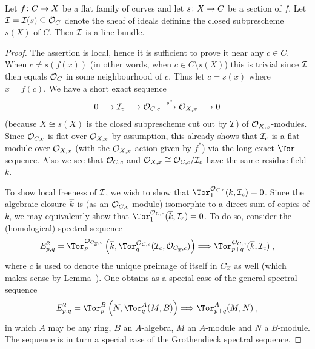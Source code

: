 \documentclass[a4paper,parskip=half,numbers=enddot, DIV=12]{scrreprt}
\begin{document}
\begin{lem}
	Let $f\colon C\morphism X$ be a flat family of curves and let $s\colon X\morphism C$ be a section of $f$. Let $\mathcal{I}=\mathcal{I}(s)\subseteq \mathcal{O}_C$ denote the sheaf of ideals defining the closed subprescheme $s(X)$ of $C$. Then $\mathcal{I}$ is a line bundle.
\end{lem}
\begin{proof}
	The assertion is local, hence it is sufficient to prove it near any $c\in C$. When $c\neq s(f(x))$ (in other words, when $c\in C\setminus s(X)$) this is trivial since $\mathcal{I}$ then equals $\mathcal{O}_C$ in some neighbourhood of $c$. Thus let $c=s(x)$ where $x=f(c)$. We have a short exact sequence
	\begin{align}\lbl{eq:s(X)closedSES}
		0\morphism \Ii_c\morphism \Oo_{C,c}\morphism[s^*]\Oo_{X,x}\morphism 0
	\end{align}
	(because $X\cong s(X)$ is the closed subprescheme cut out by $\mathcal{I}$) of $\mathcal{O}_{X,x}$-modules. Since $\mathcal{O}_{C,c}$ is flat over $\mathcal{O}_{X,x}$ by assumption, this already shows that $\mathcal{I}_c$ is a flat module over $\mathcal{O}_{X,x}$ (with the $\mathcal{O}_{X,x}$-action given by $f^*$) via the long exact $\Tor$ sequence. Also we see that $\mathcal{O}_{C,c}$ and $\mathcal{O}_{X,x}\cong \mathcal{O}_{C,c}/\mathcal{I}_c$ have the same residue field $k$.
	
	To show local freeness of $\mathcal{I}$, we wish to show that $\Tor_1^{\Oo_{C,c}}(k,\Ii_c)=0$. Since the algebraic closure $\overline{k}$ is (as an $\mathcal{O}_{C,c}$-module) isomorphic to a direct sum of copies of $k$, we may equivalently show that $\Tor_1^{\Oo_{C,c}}(\ov{k},\Ii_c)=0$. To do so, consider the (homological) spectral sequence
	\begin{align}\lbl{eq:TorSS1}
		E_{p,q}^2=\Tor_p^{\Oo_{C_{\ov{x}},c}}\left(\ov{k},\Tor_q^{\Oo_{C,c}}(\Ii_c,\Oo_{C_{\ov{x}},c})\right)\converge\Tor_{p+q}^{\Oo_{C,c}}(\ov{k},\Ii_c)\;,
	\end{align}
	where $c$ is used to denote the unique preimage of itself in $C_{\overline{x}}$ as well (which makes sense by Lemma~).	One obtains  as a special case of the general spectral sequence
	\begin{align}\lbl{eq:TorGrothendieckSS}
		E_{p,q}^2=\Tor_p^B\left(N,\Tor_q^A(M,B)\right)\converge\Tor_{p+q}^A(M,N)\;,
	\end{align}
	in which $A$ may be any ring, $B$ an $A$-algebra, $M$ an $A$-module and $N$ a $B$-module. The sequence  is in turn a special case of the Grothendieck spectral sequence. 
	

\end{proof}
\end{document}
